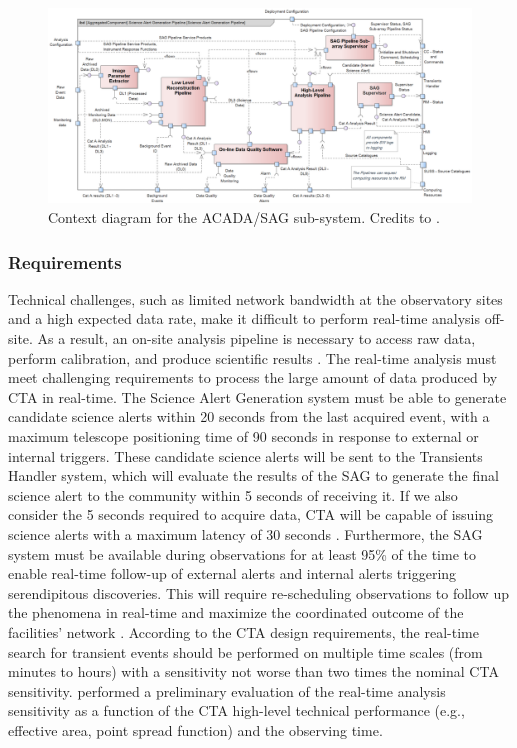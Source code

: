 \label{ss:sag-design}
\begin{figure}[!h]
\centering
\includegraphics[width=1\linewidth]{figures/introduction/sag_design.png}
\caption{Context diagram for the ACADA/SAG sub-system. Credits to \cite{sag_ddd_2022}.}
\label{fig:sag-design}
\end{figure}


\subsubsection{Requirements}
\label{ss:sag-requirements}
Technical challenges, such as limited network bandwidth at the observatory sites and a high expected data rate, make it difficult to perform real-time analysis off-site. As a result, an on-site analysis pipeline is necessary to access raw data, perform calibration, and produce scientific results \cite{bulgarelli2015on}. The real-time analysis must meet challenging requirements to process the large amount of data produced by CTA in real-time. The Science Alert Generation system must be able to generate candidate science alerts within 20 seconds from the last acquired event, with a maximum telescope positioning time of 90 seconds in response to external or internal triggers. These candidate science alerts will be sent to the Transients Handler system, which will evaluate the results of the SAG to generate the final science alert to the community within 5 seconds of receiving it. If we also consider the 5 seconds required to acquire data, CTA will be capable of issuing science alerts with a maximum latency of 30 seconds \cite{Bulgarelli_2021}.
Furthermore, the SAG system must be available during observations for at least 95\% of the time to enable real-time follow-up of external alerts and internal alerts triggering serendipitous discoveries. This will require re-scheduling observations to follow up the phenomena in real-time and maximize the coordinated outcome of the facilities' network \cite{di2020detection}. According to the CTA design requirements, the real-time search for transient events should be performed on multiple time scales (from minutes to hours) with a sensitivity not worse than two times the nominal CTA sensitivity. 
\cite{fioretti2015real} performed a preliminary evaluation of the real-time analysis sensitivity as a function of the CTA high-level technical performance (e.g., effective area, point spread function) and the observing time. 
 
